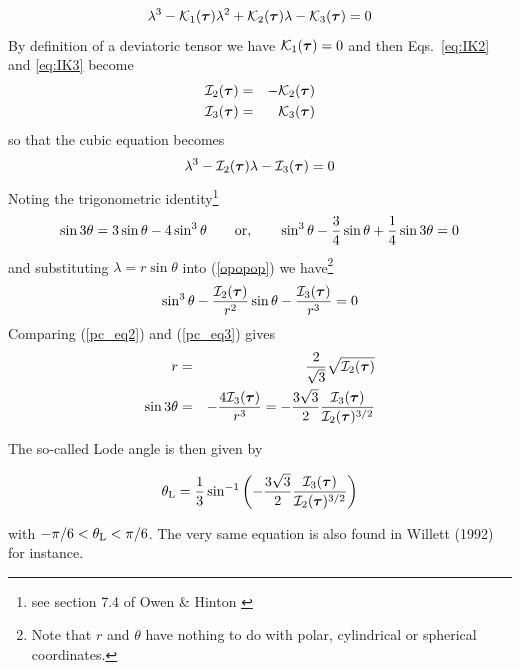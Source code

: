 \begin{equation}
\lambda^3 - {\cal K}_1({\bm \tau}) \lambda^2 + {\cal K}_2({\bm \tau}) \lambda -{\cal K}_3({\bm \tau})=0
\end{equation}
By definition of a deviatoric tensor we have ${\cal K}_1({\bm \tau})=0$ and 
then Eqs.~\eqref{eq:IK2} and \eqref{eq:IK3} become
\begin{eqnarray}
{\cal I}_2({\bm \tau}) &=&  - {\cal K}_2({\bm \tau}) \\
{\cal I}_3({\bm \tau}) &=&  {\cal K}_3({\bm \tau}) 
\end{eqnarray}
so that the cubic equation becomes
\begin{equation} 
\lambda^3 -  {\cal I}_2({\bm \tau}) \lambda -  {\cal I}_3({\bm \tau}) =0 \label{opopop}
\end{equation}
Noting the trigonometric identity\footnote{see section 7.4 of Owen \& Hinton \cite{owhi}}
\begin{equation}
\sin 3\theta = 3 \sin \theta - 4 \sin^3 \theta
\qquad
{\rm or,}
\qquad
\sin^3 \theta - \frac{3}{4}\sin \theta + \frac{1}{4} \sin 3\theta = 0\label{pc_eq2}
\end{equation}
and substituting $\lambda=r\sin \theta$ into (\ref{opopop}) we have\footnote{Note that $r$ and $\theta$ have nothing 
to do with polar, cylindrical or spherical coordinates.}
\begin{equation}
\sin^3 \theta -\frac{ {\cal I}_2({\bm \tau})   }{r^2} \sin \theta -\frac{ {\cal I}_3({\bm \tau})  }{r^3}=0\label{pc_eq3}
\end{equation}
Comparing (\ref{pc_eq2}) and (\ref{pc_eq3}) gives
\begin{eqnarray}
r&=&\frac{2}{\sqrt{3}}\sqrt{ {\cal I}_2({\bm \tau})  }\label{pc_eq4bis} \\
\sin 3 \theta &=& -\frac{4 {\cal I}_3({\bm \tau})  }{r^3}=-\frac{3\sqrt{3}}{2}\frac{ {\cal I}_3({\bm \tau}) }{ {\cal I}_2({\bm \tau}) ^{3/2}} \label{pc_eq4}
\end{eqnarray}

The so-called Lode angle  \cite{zico74} is then given by 
\begin{mdframed}[backgroundcolor=blue!5]
\begin{equation}
\theta_{\rm L}=\frac{1}{3} \sin^{-1} 
\left( -\frac{3\sqrt{3}}{2} \frac{{\cal I}_3({\bm \tau})}{{\cal I}_2({\bm \tau})^{3/2}} \right)
\label{eq:lodang}
\end{equation}
\end{mdframed}
with $-\pi/6 <\theta_{\rm L} <\pi/6 $. The very same equation is 
also found in Willett (1992) \cite{will92} for instance.

